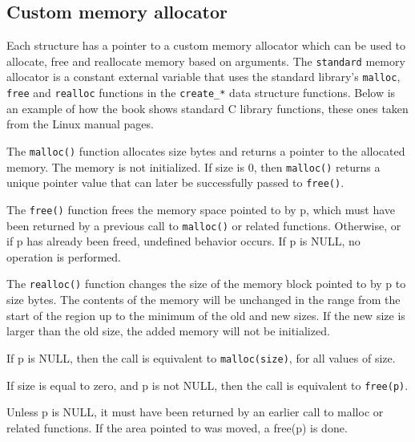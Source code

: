 \subsection{Custom memory allocator}

Each structure has a pointer to a custom memory allocator which can be used to allocate, free and reallocate memory based on arguments. The \texttt{standard} memory allocator is a constant external variable that uses the standard library's \texttt{malloc}, \texttt{free} and \texttt{realloc} functions in the \texttt{create\_*} data structure functions. Below is an example of how the book shows standard C library functions, these ones taken from the Linux manual pages.

\begin{infobox}[title=Linux manual page - malloc(3)]
The \texttt{malloc()} function allocates size bytes and returns a pointer to the allocated memory.  The memory is not initialized.  If size is 0, then \texttt{malloc()} returns a unique pointer value that can later be successfully passed to \texttt{free()}.
\end{infobox}

\begin{infobox}[title=Linux manual page - free(3)]
The \texttt{free()} function frees the memory space pointed to by p, which must have been returned by a previous call to \texttt{malloc()} or related functions.  Otherwise, or if p has already been freed, undefined behavior occurs.  If p is NULL, no operation is performed.
\end{infobox}

\begin{infobox}[title=Linux manual page - realloc(3)]
The \texttt{realloc()} function changes the size of the memory block pointed to by p to size bytes. The contents of the memory will be unchanged in the range from the start of the region up to the minimum of the old and new sizes.  If the new size is larger than the old size, the added memory will not be initialized.

If p is NULL, then the call is equivalent to \texttt{malloc(size)}, for all values of size.

If size is equal to zero, and p is not NULL, then the call is equivalent to \texttt{free(p)}.

Unless p is NULL, it must have been returned by an earlier call to malloc or related functions.  If the area pointed to was moved, a free(p) is done.
\end{infobox}


